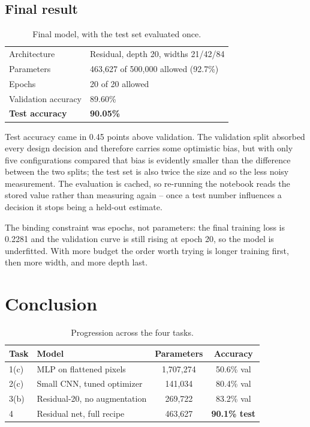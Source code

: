 \documentclass[11pt,a4paper]{article}
\begin{document}
\subsection{Final result}

\begin{table}[H]
\centering\small
\caption{Final model, with the test set evaluated once.}
\begin{tabular}{ll}
\toprule
Architecture & Residual, depth 20, widths 21/42/84 \\
Parameters   & 463{,}627 of 500{,}000 allowed (92.7\%) \\
Epochs       & 20 of 20 allowed \\
Validation accuracy & 89.60\% \\
\textbf{Test accuracy} & \textbf{90.05\%} \\
\bottomrule
\end{tabular}
\end{table}

Test accuracy came in 0.45 points above validation. The validation split
absorbed every design decision and therefore carries some optimistic bias, but
with only five configurations compared that bias is evidently smaller than the
difference between the two splits; the test set is also twice the size and so
the less noisy measurement. The evaluation is cached, so re-running the notebook
reads the stored value rather than measuring again -- once a test number
influences a decision it stops being a held-out estimate.

The binding constraint was epochs, not parameters: the final training loss is
0.2281 and the validation curve is still rising at epoch 20, so the model is
underfitted. With more budget the order worth trying is longer training first,
then more width, and more depth last.

\section{Conclusion}

\begin{table}[H]
\centering\small
\caption{Progression across the four tasks.}
\begin{tabular}{llcc}
\toprule
Task & Model & Parameters & Accuracy \\
\midrule
1(c) & MLP on flattened pixels     & 1{,}707{,}274 & 50.6\% val \\
2(c) & Small CNN, tuned optimizer   & 141{,}034     & 80.4\% val \\
3(b) & Residual-20, no augmentation & 269{,}722     & 83.2\% val \\
4    & Residual net, full recipe    & 463{,}627     & \textbf{90.1\% test} \\
\bottomrule
\end{tabular}
\end{table}
\end{document}
